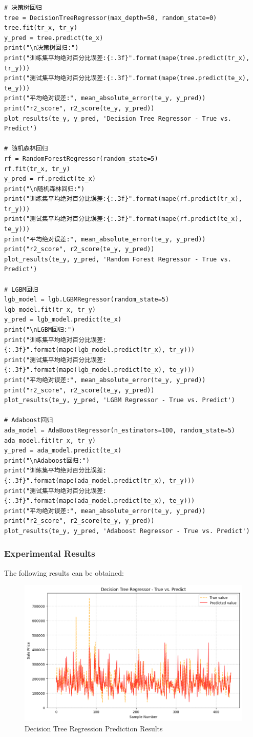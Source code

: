\documentclass[a4paper,12pt]{article}
\begin{document}
\begin{lstlisting}
# 决策树回归
tree = DecisionTreeRegressor(max_depth=50, random_state=0)
tree.fit(tr_x, tr_y)
y_pred = tree.predict(te_x)
print("\n决策树回归:")
print("训练集平均绝对百分比误差:{:.3f}".format(mape(tree.predict(tr_x), tr_y)))
print("测试集平均绝对百分比误差:{:.3f}".format(mape(tree.predict(te_x), te_y)))
print("平均绝对误差:", mean_absolute_error(te_y, y_pred))
print("r2_score", r2_score(te_y, y_pred))
plot_results(te_y, y_pred, 'Decision Tree Regressor - True vs. Predict')

# 随机森林回归
rf = RandomForestRegressor(random_state=5)
rf.fit(tr_x, tr_y)
y_pred = rf.predict(te_x)
print("\n随机森林回归:")
print("训练集平均绝对百分比误差:{:.3f}".format(mape(rf.predict(tr_x), tr_y)))
print("测试集平均绝对百分比误差:{:.3f}".format(mape(rf.predict(te_x), te_y)))
print("平均绝对误差:", mean_absolute_error(te_y, y_pred))
print("r2_score", r2_score(te_y, y_pred))
plot_results(te_y, y_pred, 'Random Forest Regressor - True vs. Predict')

# LGBM回归
lgb_model = lgb.LGBMRegressor(random_state=5)
lgb_model.fit(tr_x, tr_y)
y_pred = lgb_model.predict(te_x)
print("\nLGBM回归:")
print("训练集平均绝对百分比误差:{:.3f}".format(mape(lgb_model.predict(tr_x), tr_y)))
print("测试集平均绝对百分比误差:{:.3f}".format(mape(lgb_model.predict(te_x), te_y)))
print("平均绝对误差:", mean_absolute_error(te_y, y_pred))
print("r2_score", r2_score(te_y, y_pred))
plot_results(te_y, y_pred, 'LGBM Regressor - True vs. Predict')

# Adaboost回归
ada_model = AdaBoostRegressor(n_estimators=100, random_state=5)
ada_model.fit(tr_x, tr_y)
y_pred = ada_model.predict(te_x)
print("\nAdaboost回归:")
print("训练集平均绝对百分比误差:{:.3f}".format(mape(ada_model.predict(tr_x), tr_y)))
print("测试集平均绝对百分比误差:{:.3f}".format(mape(ada_model.predict(te_x), te_y)))
print("平均绝对误差:", mean_absolute_error(te_y, y_pred))
print("r2_score", r2_score(te_y, y_pred))
plot_results(te_y, y_pred, 'Adaboost Regressor - True vs. Predict')

\end{lstlisting}

\subsubsection{Experimental Results}
The following results can be obtained:

\begin{figure}[H]
    \centering
    \includegraphics[width=0.75\linewidth]{images/kaggle_DecisionTree.png}
    \caption{Decision Tree Regression Prediction Results}
\end{figure}
\end{document}
